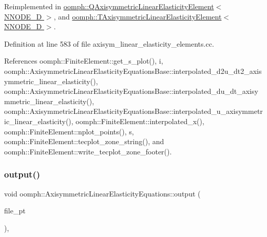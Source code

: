 Reimplemented in \hyperlink{classoomph_1_1QAxisymmetricLinearElasticityElement_a3339817db6273a1285615d05d0e99a07}{oomph\+::\+Q\+Axisymmetric\+Linear\+Elasticity\+Element$<$ N\+N\+O\+D\+E\+\_\+D $>$}, and \hyperlink{classoomph_1_1TAxisymmetricLinearElasticityElement_aa56d730cdb3e5e31f4edeb9d270c8218}{oomph\+::\+T\+Axisymmetric\+Linear\+Elasticity\+Element$<$ N\+N\+O\+D\+E\+\_\+D $>$}.



Definition at line 583 of file axisym\+\_\+linear\+\_\+elasticity\+\_\+elements.\+cc.



References oomph\+::\+Finite\+Element\+::get\+\_\+s\+\_\+plot(), i, oomph\+::\+Axisymmetric\+Linear\+Elasticity\+Equations\+Base\+::interpolated\+\_\+d2u\+\_\+dt2\+\_\+axisymmetric\+\_\+linear\+\_\+elasticity(), oomph\+::\+Axisymmetric\+Linear\+Elasticity\+Equations\+Base\+::interpolated\+\_\+du\+\_\+dt\+\_\+axisymmetric\+\_\+linear\+\_\+elasticity(), oomph\+::\+Axisymmetric\+Linear\+Elasticity\+Equations\+Base\+::interpolated\+\_\+u\+\_\+axisymmetric\+\_\+linear\+\_\+elasticity(), oomph\+::\+Finite\+Element\+::interpolated\+\_\+x(), oomph\+::\+Finite\+Element\+::nplot\+\_\+points(), s, oomph\+::\+Finite\+Element\+::tecplot\+\_\+zone\+\_\+string(), and oomph\+::\+Finite\+Element\+::write\+\_\+tecplot\+\_\+zone\+\_\+footer().

\mbox{\label{classoomph_1_1AxisymmetricLinearElasticityEquations_a8a96657fee4dd85fdbbf25d0855c27f2}} 
\subsubsection{\texorpdfstring{output()}{output()}\hspace{0.1cm}{\footnotesize\ttfamily [3/4]}}
{\footnotesize\ttfamily void oomph\+::\+Axisymmetric\+Linear\+Elasticity\+Equations\+::output (\begin{DoxyParamCaption}\item[{F\+I\+LE $\ast$}]{file\+\_\+pt }\end{DoxyParamCaption})\hspace{0.3cm}{\ttfamily [inline]}, {\ttfamily [virtual]}}



